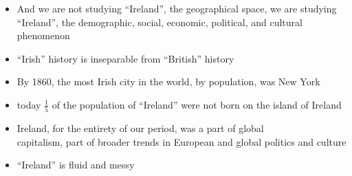\documentclass[12pt]{article}
\begin{document}
\begin{itemize}
\begin{itemize}
                    \item And we are not studying ``Ireland'', the geographical space, we are studying ``Ireland'', the demographic, social, economic, political, and cultural phenomenon
                    \item ``Irish'' history is inseparable from ``British'' history
                    \item By 1860, the most Irish city in the world, by population, was New York
                    \item today $\frac{1}{5}$ of the population of ``Ireland'' were not born on the island of Ireland
                    \item Ireland, for the entirety of our period, was a part of global \\capitalism, part of broader trends in European and global politics and culture
                    \item ``Ireland'' is fluid and messy
                \end{itemize}
            \end{itemize}
\end{document}
